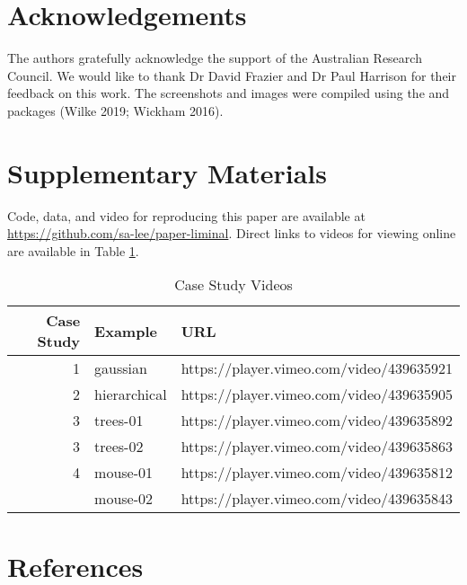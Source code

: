 \documentclass[article,notitle]{jdssv}
\begin{document}
\hypertarget{acknowledgements}{%
\section*{Acknowledgements}\label{acknowledgements}}

The authors gratefully acknowledge the support of the Australian Research Council.
We would like to thank Dr David Frazier and Dr Paul Harrison for
their feedback on this work. The screenshots and images were compiled using the
 and  packages (Wilke 2019; Wickham 2016).

\hypertarget{supplementary-materials}{%
\section*{Supplementary Materials}\label{supplementary-materials}}

Code, data, and video for reproducing this paper are available at \url{https://github.com/sa-lee/paper-liminal}. Direct links to videos for viewing
online are available in Table \ref{tab:vimeo}.

\begin{table}

\caption{\label{tab:vimeo}Case Study Videos}
\centering
\begin{tabular}[t]{rll}
\toprule
Case Study & Example & URL\\
\midrule
1 & gaussian & https://player.vimeo.com/video/439635921\\
2 & hierarchical & https://player.vimeo.com/video/439635905\\
3 & trees-01 & https://player.vimeo.com/video/439635892\\
3 & trees-02 & https://player.vimeo.com/video/439635863\\
4 & mouse-01 & https://player.vimeo.com/video/439635812\\
\addlinespace
4 & mouse-02 & https://player.vimeo.com/video/439635843\\
\bottomrule
\end{tabular}
\end{table}

\hypertarget{references}{%
\section*{References}\label{references}}
\end{document}
